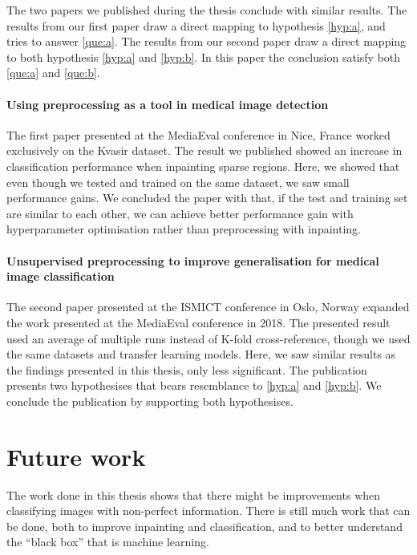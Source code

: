 The two papers we published during the thesis conclude with similar results. The results from our first paper draw a direct mapping to hypothesis \ref{hyp:a}, and tries to answer \ref{que:a}. The results from our second paper draw a direct mapping to both hypothesis \ref{hyp:a} and \ref{hyp:b}. In this paper the conclusion satisfy both \ref{que:a} and \ref{que:b}. 


\paragraph{Using preprocessing as a tool in medical image detection~\cite{Mathias2018MediaevalPaper}}
The first paper presented at the MediaEval conference in Nice, France worked exclusively on the Kvasir dataset. The result we published showed an increase in classification performance when inpainting sparse regions. 
Here, we showed that even though we tested and trained on the same dataset, we saw small performance gains. We concluded the paper with that, if the test and training set are similar to each other, we can achieve better performance gain with hyperparameter optimisation rather than preprocessing with inpainting. 

\paragraph{Unsupervised preprocessing to improve generalisation for medical image classification~\cite{Mathias2019IEEpaper}}
The second paper presented at the ISMICT conference in Oslo, Norway expanded the work presented at the MediaEval conference in 2018.
The presented result used an average of multiple runs instead of K-fold cross-reference, though we used the same datasets and transfer learning models.
Here, we saw similar results as the findings presented in this thesis, only less significant. The publication presents two hypothesises that bears resemblance to \ref{hyp:a} and \ref{hyp:b}. We conclude the publication by supporting both hypothesises.




\section{Future work}
The work done in this thesis shows that there might be improvements when classifying images with non-perfect information. There is still much work that can be done, both to improve inpainting and classification, and to better understand the ``black box'' that is machine learning. 

